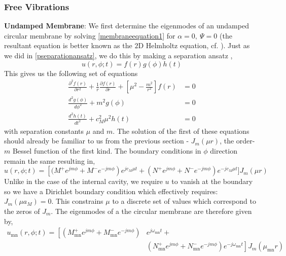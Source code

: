 \subsubsection*{Free Vibrations}
\noindent\textbf{Undamped Membrane}: We first determine the eigenmodes of an undamped circular membrane by solving \eqref{membraneequation1} for $\alpha=0,\ \Psi=0$
(the resultant equation is better known as the $2$D Helmholtz equation, cf. \cite[p.~187]{asmar2005partial}). Just as we did in \eqref{pseparationansatz},
we do this by making a separation ansatz ,
\begin{equation}\label{mseparationansatz}
 u(r,\phi;t)=f(r)g(\phi)h(t)
\end{equation}
This gives us the following set of equations
\begin{align}
 \frac{\partial^2 f(r)}{\partial r^2} + \frac{1}{r}\frac{\partial f(r)}{\partial r}+\left[\mu^2-\frac{m^2}{r^2}\right]f(r)&=0\label{besselequation2}\\
  \frac{d^2 g(\phi)}{d\phi^2}+m^2g(\phi)&=0\\
 \frac{d^2 h(t)}{dt^2}+c^2_M\mu^2h(t)&=0
\end{align}
with separation constants $\mu$ and $m$. The solution of the first of these equations should already be familiar to us from the previous section - $J_m(\mu r)$,
 the order-$m$ Bessel function of the first kind. The boundary conditions in $\phi$ direction remain the same resulting in,
\begin{equation}\label{specificmembrane1}
 u(r,\phi;t)=\left[(M^+e^{jm\phi}+M^-e^{-jm\phi}\right)e^{jc_M\mu t}+(N^+e^{jm\phi}+N^-e^{-jm\phi})e^{-jc_M\mu t}] J_m(\mu r)
\end{equation}
Unlike in the case of the internal cavity, we require $u$ to vanish at the boundary so we have a Dirichlet boundary condition which
effectively requires: $J_m(\mu a_M)=0$. This constrains $\mu$ to a discrete set of values which correspond to the zeros of $J_m$. The eigenmodes of a 
the circular membrane are therefore given by,
\begin{equation}\label{membraneeigen}
\begin{split}
 u_{\mathrm{mn}}(r,\phi;t)=\left[(M^+_{\mathrm{mn}}e^{jm\phi}+M^-_{\mathrm{mn}}e^{-jm\phi})\right.& e^{j\omega_{\mathrm{mn}} t}+ \\
 &\left.(N^+_{\mathrm{mn}}e^{jm\phi}+N^-_{\mathrm{mn}}e^{-jm\phi})e^{-j\omega_{\mathrm{mn}} t}\right] J_m(\mu_{\mathrm{mn}} r)
 \end{split}
\end{equation}

